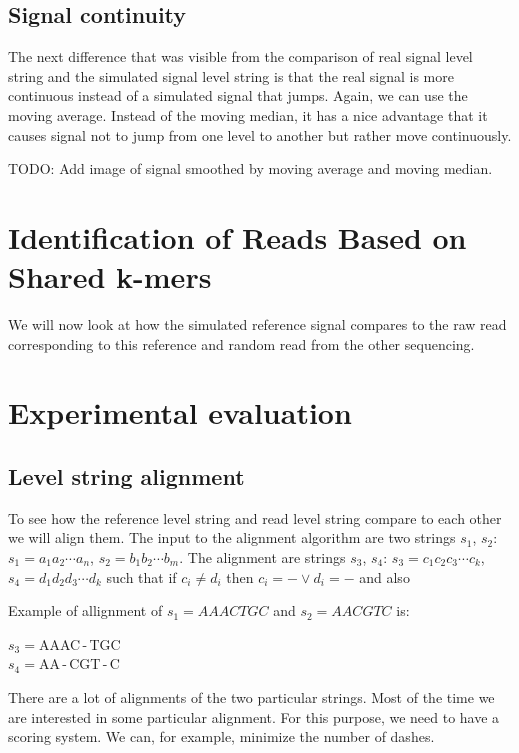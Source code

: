 \subsection{Signal continuity}

The next difference that was visible from the comparison of real signal level string
and the simulated signal level string is that the real signal is more continuous instead
of a simulated signal that jumps. Again, we can use the moving average. Instead of
the moving median, it has a nice advantage that it causes signal not to jump from
one level to another but rather move continuously.

TODO: Add image of signal smoothed by moving average and moving median.

\section{Identification of Reads Based on Shared k-mers}

We will now look at how the simulated reference signal compares to the raw read
corresponding to this reference and random read from the other sequencing.

\section{Experimental evaluation}


\subsection{Level string alignment}

To see how the reference level string and read level string compare to each other
we will align them. The input to the alignment algorithm are two strings $s_1$, $s_2$:
$s_1=a_1a_2\cdots a_n$, $s_2=b_1b_2\cdots b_m$. The alignment are strings
$s_3$, $s_4$: $s_3 = c_1c_2c_3\cdots c_k$, $s_4 = d_1d_2d_3\cdots d_k$
such that if $c_i \neq d_i$ then $c_i = - \lor d_i = -$ and also 

Example of allignment of $s_1 = AAACTGC$ and $s_2 = AACGTC$ is:

\begin{center}
$s_3 = $AAAC\,-\,TGC\\
$s_4 = $AA\,-\,CGT\,-\,C
\end{center}

There are a lot of alignments of the two particular strings. Most of the time we
are interested in some particular alignment. For this purpose, we need to have a
scoring system. We can, for example, minimize the number of dashes.

